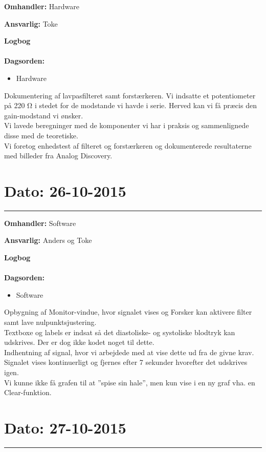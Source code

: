 \textbf{Omhandler:} Hardware

\textbf{Ansvarlig:} Toke

\textbf{Logbog}
\\
\\
\textbf{Dagsorden:}
\begin{itemize}
	\item Hardware
\end{itemize}
	
Dokumentering af lavpasfilteret samt forstærkeren. Vi indsatte et potentiometer på 220 Ω i stedet for de modstande vi havde i serie. Herved kan vi få præcis den gain-modstand vi ønsker. \\
Vi lavede beregninger med de komponenter vi har i praksis og sammenlignede disse med de teoretiske. \\
Vi foretog enhedstest af filteret og forstærkeren og dokumenterede resultaterne med billeder fra Analog Discovery. 
	
	
	
	
\section{Dato: 26-10-2015 }
\hrule

\textbf{Omhandler:} Software

\textbf{Ansvarlig:} Anders og Toke

\textbf{Logbog}
\\
\\
\textbf{Dagsorden:}
\begin{itemize}
	\item Software
\end{itemize}

Opbygning af Monitor-vindue, hvor signalet vises og Forsker kan aktivere filter samt lave nulpunktsjustering. \\
Textboxe og labels er indsat så det diastoliske- og systoliske blodtryk kan udskrives. Der er dog ikke kodet noget til dette. \\
Indhentning af signal, hvor vi arbejdede med at vise dette ud fra de givne krav. Signalet vises kontinuerligt og fjernes efter 7 sekunder hvorefter det udskrives igen. \\
Vi kunne ikke få grafen til at ”spise sin hale”, men kun vise i en ny graf vha. en Clear-funktion. 





\section{Dato: 27-10-2015 }
\hrule

